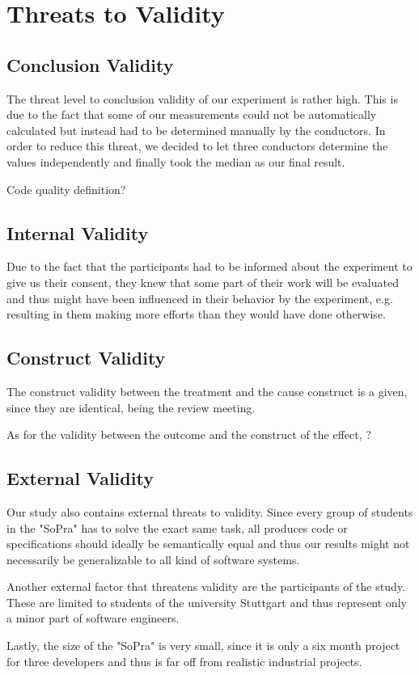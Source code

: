 \section{Threats to Validity}

\subsection{Conclusion Validity}

The threat level to conclusion validity of our experiment is rather high. This is due to the fact
that some of our measurements could not be automatically calculated but instead had to be determined
manually by the conductors. In order to reduce this threat, we decided to let three conductors
determine the values independently and finally took the median as our final result.

Code quality definition?

\subsection{Internal Validity}

Due to the fact that the participants had to be informed about the experiment to give us their
consent, they knew that some part of their work will be evaluated and thus might have been
influenced in their behavior by the experiment, e.g. resulting in them making more efforts than they would have done otherwise.

\subsection{Construct Validity}

The construct validity between the treatment and the cause construct is a given, since they are identical, being the review meeting.

As for the validity between the outcome and the construct of the effect, ?

\subsection{External Validity}

Our study also contains external threats to validity. Since every group of students in the "SoPra"
has to solve the exact same task, all produces code or specifications should ideally be semantically
equal and thus our results might not necessarily be generalizable to all kind of software systems.

Another external factor that threatens validity are the participants of the study. These are limited
to students of the university Stuttgart and thus represent only a minor part of software engineers.

Lastly, the size of the "SoPra" is very small, since it is only a six month project for three developers and thus is far off from realistic industrial projects.